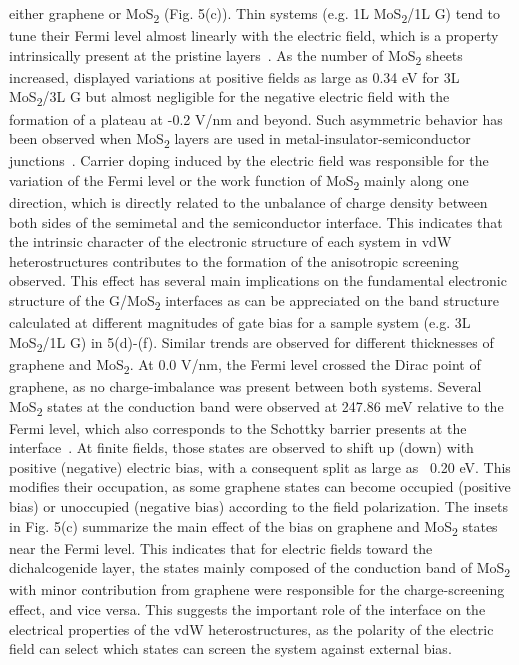 either graphene or MoS\textsubscript{2} (Fig. 5(c)). Thin systems (e.g. 1L MoS\textsubscript{2}/1L G)
tend to tune their Fermi level almost linearly with the electric
field, which is a property intrinsically present at the pristine
layers~\cite{Yu_2009_Tuning,Wang_2010_carrier_gr,Li_2013_WF_mos2}.  As
the number of MoS\textsubscript{2} sheets increased, displayed variations at positive
fields as large as 0.34 eV for 3L MoS\textsubscript{2}/3L G but almost negligible for
the negative electric field with the formation of a plateau at -0.2
V/nm and beyond. Such asymmetric behavior has been observed when MoS\textsubscript{2}
layers are used in metal-insulator-semiconductor
junctions~\cite{Chu_2017_eh_tunneling}. Carrier doping induced by the
electric field was responsible for the variation of the Fermi level or
the work function of MoS\textsubscript{2} mainly along one direction, which is
directly related to the unbalance of charge density between both sides
of the semimetal and the semiconductor interface. This indicates that
the intrinsic character of the electronic structure of each system in
vdW heterostructures contributes to the formation of the anisotropic
screening observed. This effect has several main implications on the
fundamental electronic structure of the G/MoS\textsubscript{2} interfaces as can be
appreciated on the band structure calculated at different magnitudes
of gate bias for a sample system (e.g. 3L MoS\textsubscript{2}/1L G) in 
5(d)-(f). Similar trends are observed for different thicknesses of
graphene and MoS\textsubscript{2}. At 0.0 V/nm, the Fermi level crossed the Dirac
point of graphene, as no charge-imbalance was present between both
systems. Several MoS\textsubscript{2} states at the conduction band were observed at
247.86 meV relative to the Fermi level, which also corresponds to the
Schottky barrier presents at the interface~\cite{Yu_2014_gr_mos2}.
%
At
finite fields, those states are observed to shift up (down) with
positive (negative) electric bias, with a consequent split as large as
~0.20 eV. This modifies their occupation, as some graphene states can
become occupied (positive bias) or unoccupied (negative bias)
according to the field polarization. The insets in Fig. 5(c) summarize
the main effect of the bias on graphene and MoS\textsubscript{2} states near the Fermi
level.  This indicates that for electric fields toward the
dichalcogenide layer, the states mainly composed of the conduction
band of MoS\textsubscript{2} with minor contribution from graphene were responsible
for the charge-screening effect, and vice versa. This suggests the
important role of the interface on the electrical properties of the
vdW heterostructures, as the polarity of the electric field can select
which states can screen the system against external bias.



